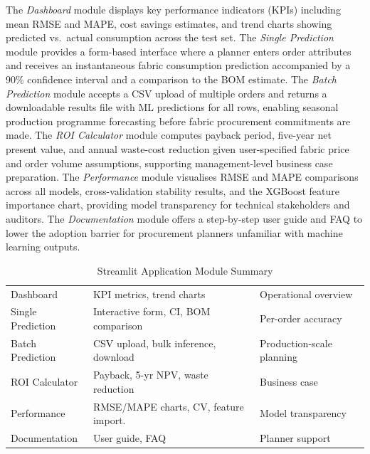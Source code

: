 The \textit{Dashboard} module displays key performance indicators (KPIs) including mean RMSE and MAPE, cost savings estimates, and trend charts showing predicted vs.\ actual consumption across the test set. The \textit{Single Prediction} module provides a form-based interface where a planner enters order attributes and receives an instantaneous fabric consumption prediction accompanied by a 90\% confidence interval and a comparison to the BOM estimate. The \textit{Batch Prediction} module accepts a CSV upload of multiple orders and returns a downloadable results file with ML predictions for all rows, enabling seasonal production programme forecasting before fabric procurement commitments are made. The \textit{ROI Calculator} module computes payback period, five-year net present value, and annual waste-cost reduction given user-specified fabric price and order volume assumptions, supporting management-level business case preparation. The \textit{Performance} module visualises RMSE and MAPE comparisons across all models, cross-validation stability results, and the XGBoost feature importance chart, providing model transparency for technical stakeholders and auditors. The \textit{Documentation} module offers a step-by-step user guide and FAQ to lower the adoption barrier for procurement planners unfamiliar with machine learning outputs.

\begin{table}[htbp]
\centering\caption{Streamlit Application Module Summary}\label{tab:app}
\begin{tabularx}{\textwidth}{@{}L{3.5cm} L{6.5cm} Z@{}}
  \toprule{}&&\\
  \midrule
  Dashboard&KPI metrics, trend charts&Operational overview\\
  Single Prediction&Interactive form, CI, BOM comparison&Per-order accuracy\\
  Batch Prediction&CSV upload, bulk inference, download&Production-scale planning\\
  ROI Calculator&Payback, 5-yr NPV, waste reduction&Business case\\
  Performance&RMSE/MAPE charts, CV, feature import.&Model transparency\\
  Documentation&User guide, FAQ&Planner support\\
  \bottomrule
\end{tabularx}
\end{table}

\secdiv
